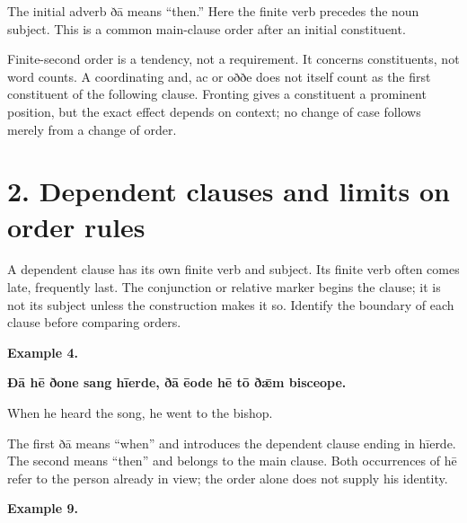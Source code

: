 The initial adverb ðā means “then.” Here the finite verb precedes the noun subject. This is a common main-clause order after an initial constituent.

Finite-second order is a tendency, not a requirement. It concerns constituents, not word counts. A coordinating and, ac or oððe does not itself count as the first constituent of the following clause. Fronting gives a constituent a prominent position, but the exact effect depends on context; no change of case follows merely from a change of order.

\section*{2. Dependent clauses and limits on order rules}

A dependent clause has its own finite verb and subject. Its finite verb often comes late, frequently last. The conjunction or relative marker begins the clause; it is not its subject unless the construction makes it so. Identify the boundary of each clause before comparing orders.

\textbf{Example 4.}

\textbf{Ðā hē ðone sang hīerde, ðā ēode hē tō ðǣm bisceope.}

When he heard the song, he went to the bishop.

The first ðā means “when” and introduces the dependent clause ending in hīerde. The second means “then” and belongs to the main clause. Both occurrences of hē refer to the person already in view; the order alone does not supply his identity.

\textbf{Example 9.}


